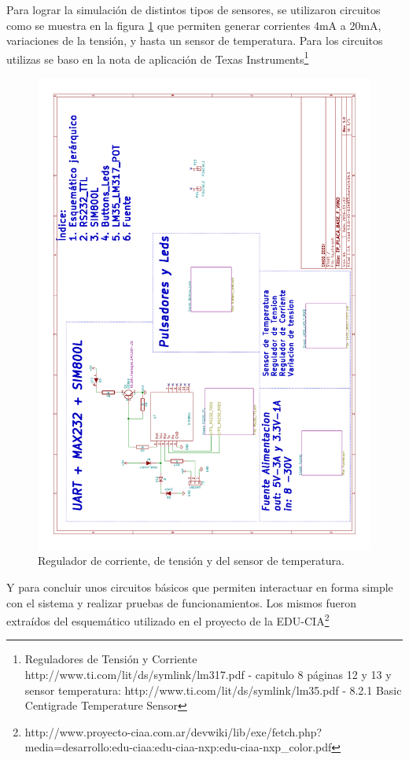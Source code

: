 Para lograr la simulación de distintos tipos de sensores, se utilizaron circuitos como se muestra en la figura \ref{fig:temp_tens}  que permiten generar corrientes 4mA a 20mA, variaciones de la tensión, y hasta un sensor de temperatura. Para los circuitos utilizas se baso en la nota de aplicación de Texas Instruments\footnote{Reguladores de Tensión y Corriente http://www.ti.com/lit/ds/symlink/lm317.pdf - capitulo 8 páginas 12 y 13 y sensor temperatura: http://www.ti.com/lit/ds/symlink/lm35.pdf - 8.2.1 Basic Centigrade Temperature Sensor } 
\begin{figure}[h]
      \centering
      \includegraphics[page=4,scale=0.3,angle=270]{./Figures/schematic.pdf}
      \caption{Regulador de corriente, de tensión y del sensor de temperatura.}
      \label{fig:temp_tens}
\end{figure}

Y para concluir unos circuitos básicos que permiten interactuar en forma simple con el sistema y realizar pruebas de funcionamientos. Los mismos fueron extraídos del esquemático utilizado en el proyecto de la EDU-CIA\footnote{http://www.proyecto-ciaa.com.ar/devwiki/lib/exe/fetch.php?media=desarrollo:edu-ciaa:edu-ciaa-nxp:edu-ciaa-nxp\_color.pdf}

